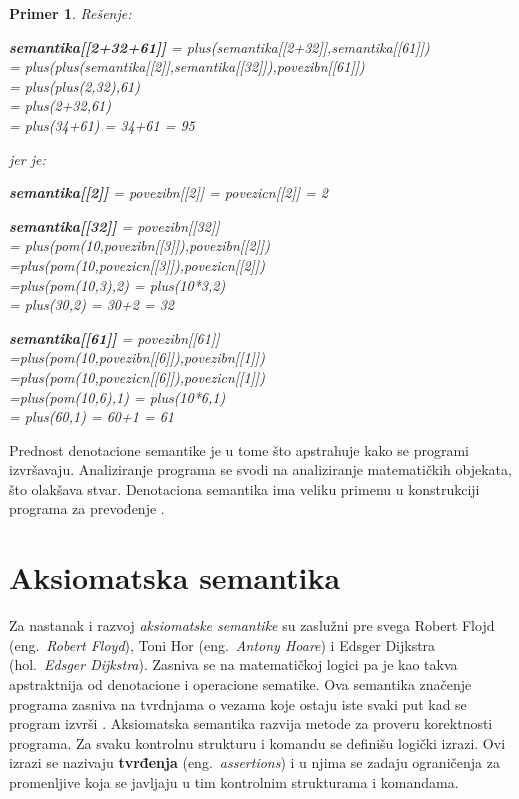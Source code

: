 \documentclass[a4paper]{article}
\newtheorem{primer}{Primer}[section]
\begin{document}
{\begin{primer}
Rešenje:
\begin{center}
\textbf{semantika[[2+32+61]]} = plus(semantika[[2+32]],semantika[[61]])\\
= plus(plus(semantika[[2]],semantika[[32]]),povezibn[[61]])\\
= plus(plus(2,32),61)\\
= plus(2+32,61)\\
= plus(34+61) = 34+61 = 95
\end{center}

jer je:

\begin{center}
\textbf{semantika[[2]]} = povezibn[[2]] = povezicn[[2]] = 2
\end{center}
\begin{center}
\textbf{semantika[[32]]} = povezibn[[32]]\\
= plus(pom(10,povezibn[[3]]),povezibn[[2]])\\
=plus(pom(10,povezicn[[3]]),povezicn[[2]]) \\
=plus(pom(10,3),2) = plus(10*3,2)\\
= plus(30,2) = 30+2 = 32\end{center}

\begin{center}
\textbf{semantika[[61]]} = povezibn[[61]] \\
=plus(pom(10,povezibn[[6]]),povezibn[[1]])\\
=plus(pom(10,povezicn[[6]]),povezicn[[1]]) \\
=plus(pom(10,6),1) = plus(10*6,1)\\
= plus(60,1) = 60+1 = 61

\end{center}
\end{primer}

 Prednost denotacione semantike je u tome što apstrahuje kako se programi izvršavaju. Analiziranje programa se svodi na analiziranje matematičkih objekata, što olakšava stvar. Denotaciona semantika ima veliku primenu u konstrukciji programa za prevođenje \cite{parezanovic}.

\section{Aksiomatska semantika}
\label{sec:akssem}
\qquad Za nastanak i razvoj \textit{aksiomatske semantike}  su zaslužni pre svega Robert Flojd (eng.~{\em  Robert Floyd}), Toni Hor (eng.~{\em  Antony Hoare}) i Edsger Dijkstra (hol.~{\em Edsger Dijkstra}).
 Zasniva se na matematičkoj logici pa je kao takva apstraktnija od denotacione i operacione sematike. Ova semantika
 značenje programa zasniva na tvrdnjama o vezama koje ostaju iste svaki put kad se program izvrši \cite{slonneger1995book}.
 Aksiomatska semantika razvija metode za proveru korektnosti programa. Za svaku kontrolnu strukturu i komandu se definišu logički izrazi. Ovi izrazi se nazivaju \textbf{tvrđenja} (eng.~{\em  assertions}) i u njima se zadaju ograničenja za promenljive koja se javljaju u tim kontrolnim strukturama i komandama.

}
\end{document}
